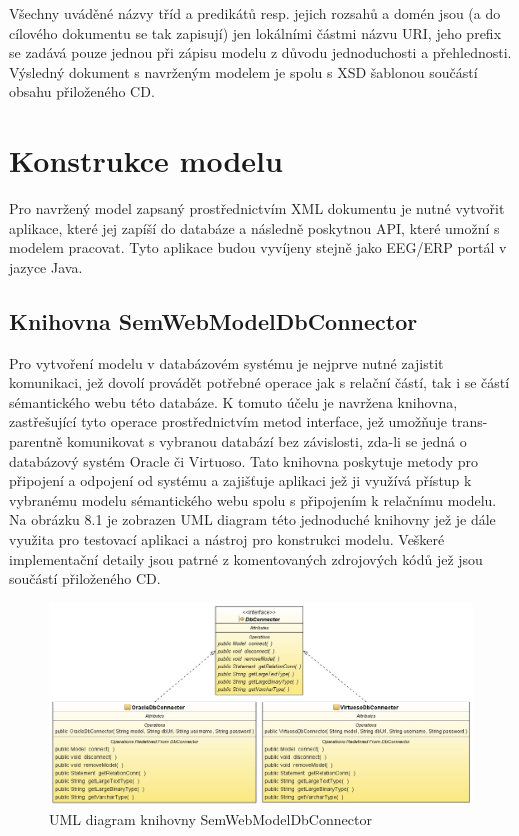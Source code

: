 \documentclass{projekt}
\begin{document}
Všechny uváděné názvy tříd a predikátů resp. jejich rozsahů a domén jsou (a do cílového dokumentu se tak zapisují) jen lokálními částmi názvu URI, jeho prefix se zadává pouze jednou při zápisu modelu z důvodu jednoduchosti a přehlednosti.
Výsledný dokument s navrženým modelem je spolu s XSD šablonou součástí obsahu přiloženého CD.

\section{Konstrukce modelu}
\hspace{0.65cm}Pro navržený model zapsaný prostřednictvím XML dokumentu je nutné vytvořit aplikace, které jej zapíší do databáze a následně poskytnou API, které umožní s modelem pracovat. Tyto aplikace budou vyvíjeny stejně jako EEG/ERP portál v jazyce Java.

\subsection{Knihovna SemWebModelDbConnector}
\hspace{0.65cm}Pro vytvoření modelu v databázovém systému je nejprve nutné zajistit komunikaci, jež dovolí provádět potřebné operace jak s relační částí, tak i se částí sémantického webu této databáze. K tomuto účelu je navržena knihovna, zastřešující tyto operace prostřednictvím metod interface, jež umožňuje trans-\\parentně komunikovat s vybranou databází bez závislosti, zda-li se jedná o databázový systém Oracle či Virtuoso. Tato knihovna poskytuje metody pro připojení a odpojení od systému a zajišťuje aplikaci jež ji využívá přístup k vybranému modelu sémantického webu spolu s připojením k relačnímu modelu. Na obrázku 8.1 je zobrazen UML diagram této jednoduché knihovny jež je dále využita pro testovací aplikaci a nástroj pro konstrukci modelu. Veškeré implementační detaily jsou patrné z komentovaných zdrojových kódů jež jsou součástí přiloženého CD.

\vspace{0.65cm}

\begin{figure}[htb]
\begin{center}
\includegraphics[scale=0.46]{db-connect.jpg}
\caption{UML diagram knihovny SemWebModelDbConnector}
\end{center}
\end{figure}
\end{document}
